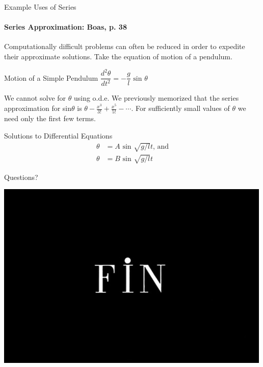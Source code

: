 \documentclass{beamer}
\begin{document}
\begin{frame}{Example Uses of Series}
	\framesubtitle{Series Approximation: Boas, p. 38}
	Computationally difficult problems can often be reduced in order to expedite their approximate solutions.  Take the equation of motion of a pendulum.
	\begin{exampleblock}{Motion of a Simple Pendulum}
	$\dfrac{d^{2}\theta}{dt^{2}} = -\dfrac{g}{l}\mbox{~sin\ }\theta$
	\end{exampleblock}
	We cannot solve for $\theta$ using o.d.e.  We previously memorized that the series approximation for sin$\theta$ is $\theta - \frac{x^{3}}{3!}+\frac{x^{5}}{5!}-\cdots$.  For sufficiently small values of $\theta$ we need only the first few terms.
	\begin{exampleblock}{Solutions to Differential Equations}
	\begin{align*}
	\theta &= A \mbox{~sin\ }\sqrt{g/l}t \mbox{, and} \\
	\theta &= B \mbox{~sin\ }\sqrt{g/l}t
	\end{align*}
	\end{exampleblock}
\end{frame}
  
\begin{frame}{Questions?}
	\begin{center}
		\includegraphics[width=.7\textwidth]{images/fin.png}
	\end{center}
\end{frame}
\end{document}
